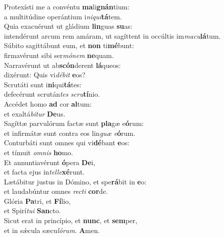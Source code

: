 \evenverse Protexísti me a convéntu \textbf{ma}li\textbf{gnán}tium:~\*\\
\evenverse a multitúdine operántium i\textit{ni}\textit{qui}\textbf{tá}tem.\\
\oddverse Quia exacuérunt ut gládium \textbf{lin}guas \textbf{su}as:~\*\\
\oddverse intendérunt arcum rem amáram, ut sagíttent in occúltis im\textit{ma}\textit{cu}\textbf{lá}tum.\\
\evenverse Súbito sagittábunt eum, et \textbf{non} ti\textbf{mé}bunt:~\*\\
\evenverse firmavérunt sibi ser\textit{mó}\textit{nem} \textbf{ne}quam.\\
\oddverse Narravérunt ut ab\textbf{scón}derent \textbf{lá}queos:~\*\\
\oddverse dixérunt: Quis vi\textit{dé}\textit{bit} \textbf{e}os?\\
\evenverse Scrutáti sunt i\textbf{ni}qui\textbf{tá}tes:~\*\\
\evenverse defecérunt scrután\textit{tes} \textit{scru}\textbf{tí}nio.\\
\oddverse Accédet homo \textbf{ad} cor \textbf{al}tum:~\*\\
\oddverse et exaltá\textit{bi}\textit{tur} \textbf{De}us.\\
\evenverse Sagíttæ parvulórum factæ sunt \textbf{pla}gæ e\textbf{ó}rum:~\*\\
\evenverse et infirmátæ sunt contra eos lin\textit{guæ} \textit{e}\textbf{ó}rum.\\
\oddverse Conturbáti sunt omnes qui vi\textbf{dé}bant \textbf{e}os:~\*\\
\oddverse et tímuit \textit{om}\textit{nis} \textbf{ho}mo.\\
\evenverse Et annuntiavérunt \textbf{ó}pera \textbf{De}i,~\*\\
\evenverse et facta ejus in\textit{tel}\textit{le}\textbf{xé}runt.\\
\oddverse Lætábitur justus in Dómino, et spe\textbf{rá}bit in \textbf{e}o:~\*\\
\oddverse et laudabúntur omnes \textit{re}\textit{cti} \textbf{cor}de.\\
\evenverse Glória \textbf{Pa}tri, et \textbf{Fí}lio,~\*\\
\evenverse et Spirí\textit{tu}\textit{i} \textbf{San}cto.\\
\oddverse Sicut erat in princípio, et \textbf{nunc}, et \textbf{sem}per,~\*\\
\oddverse et in sǽcula sæcu\textit{ló}\textit{rum}. \textbf{A}men.\\
